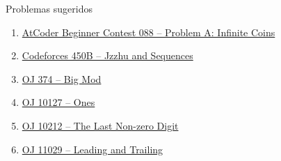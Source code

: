 \begin{frame}[fragile]{Problemas sugeridos}

    \begin{enumerate}
        \item \href{https://atcoder.jp/contests/abc088/tasks/abc088_a}{AtCoder Beginner Contest 088 -- Problem A: Infinite Coins}

        \item \href{https://codeforces.com/problemset/problem/450/B}{Codeforces 450B -- Jzzhu and Sequences}

        \item \href{https://onlinejudge.org/index.php?option=com_onlinejudge&Itemid=8&category=24&page=show_problem&problem=310}{OJ 374 -- Big Mod} 

        \item \href{https://onlinejudge.org/index.php?option=com_onlinejudge&Itemid=8&category=24&page=show_problem&problem=1068}{OJ 10127 -- Ones}

        \item \href{https://onlinejudge.org/index.php?option=com_onlinejudge&Itemid=8&category=24&page=show_problem&problem=1153}{OJ 10212 -- The Last Non-zero Digit}

        \item \href{https://onlinejudge.org/index.php?option=com_onlinejudge&Itemid=8&category=24&page=show_problem&problem=1970}{OJ 11029 -- Leading and Trailing}
    \end{enumerate}

\end{frame}
